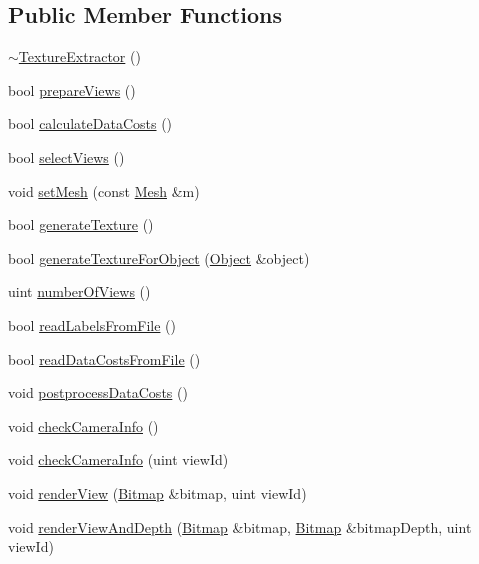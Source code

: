 \subsection*{Public Member Functions}
\begin{DoxyCompactItemize}
\item 
\hyperlink{class_texture_extractor_a2e801688662a864437a2c78cec83f34e}{$\sim$\+Texture\+Extractor} ()
\item 
bool \hyperlink{class_texture_extractor_a5d1efa1c5208f8a1e67142dd38fbf5a2}{prepare\+Views} ()
\item 
bool \hyperlink{class_texture_extractor_af7e364344bda2e0c6784c82b50a6f979}{calculate\+Data\+Costs} ()
\item 
bool \hyperlink{class_texture_extractor_abeb85c1ced22591fda614af1f351e817}{select\+Views} ()
\item 
void \hyperlink{class_texture_extractor_ae02d3f7a8ebf636fd7fc17ab13570f59}{set\+Mesh} (const \hyperlink{class_mesh}{Mesh} \&m)
\item 
bool \hyperlink{class_texture_extractor_a58176e3b3dc4f2edaaa900a7e922ab05}{generate\+Texture} ()
\item 
bool \hyperlink{class_texture_extractor_aeda3235d55d4dec0d1f40d42bc97a2c4}{generate\+Texture\+For\+Object} (\hyperlink{struct_object}{Object} \&object)
\item 
uint \hyperlink{class_texture_extractor_a57b2eef07397ceeedf461343aff6afbc}{number\+Of\+Views} ()
\item 
bool \hyperlink{class_texture_extractor_ad3855ac7764dc5af24e776e928bed802}{read\+Labels\+From\+File} ()
\item 
bool \hyperlink{class_texture_extractor_a9f3605a51c466cca05f8ff216c84d574}{read\+Data\+Costs\+From\+File} ()
\item 
void \hyperlink{class_texture_extractor_a196dde057ce49bcae8cc7d07cf00f8cc}{postprocess\+Data\+Costs} ()
\item 
void \hyperlink{class_texture_extractor_a82baa1e8ae7c17bd9f1d44b431f82f86}{check\+Camera\+Info} ()
\item 
void \hyperlink{class_texture_extractor_a93b91c57ec384eaf45a36c917b6c9e63}{check\+Camera\+Info} (uint view\+Id)
\item 
void \hyperlink{class_texture_extractor_a77c9ce096ece162dac08599fc7c0ee47}{render\+View} (\hyperlink{class_bitmap}{Bitmap} \&bitmap, uint view\+Id)
\item 
void \hyperlink{class_texture_extractor_ab805f165c443e6f1616ee0be9afa74e3}{render\+View\+And\+Depth} (\hyperlink{class_bitmap}{Bitmap} \&bitmap, \hyperlink{class_bitmap}{Bitmap} \&bitmap\+Depth, uint view\+Id)
\end{DoxyCompactItemize}


